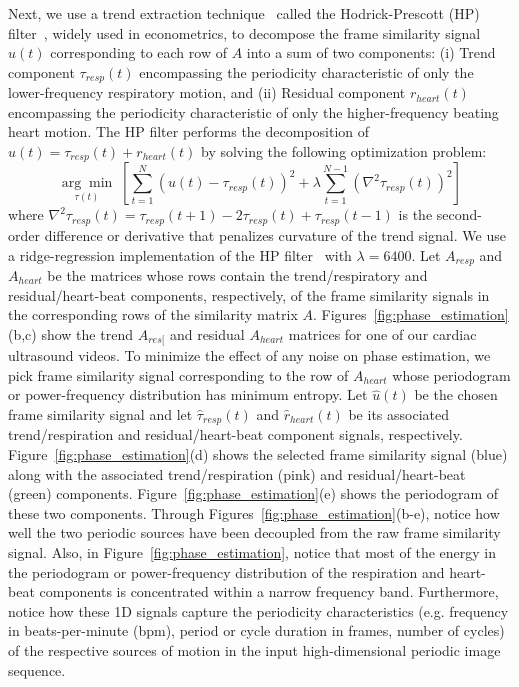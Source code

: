 \documentclass[runningheads,a4paper]{llncs}
\newcommand{\argmin}[1]{\underset{#1}{\operatorname{arg}\operatorname{min}}\;}
\begin{document}
	Next, we use a trend extraction technique~\cite{Alexandrov2012} called the Hodrick-Prescott (HP) filter~\cite{Hodrick1997}, widely used in econometrics, to decompose the frame similarity signal $u(t)$ corresponding to each row of $A$ into a sum of two components: (i) Trend component $\tau_{resp}(t)$ encompassing the periodicity characteristic of only the lower-frequency respiratory motion, and (ii) Residual component $r_{heart}(t)$ encompassing the periodicity characteristic of only the higher-frequency beating heart motion. The HP filter performs the decomposition of $u(t) = \tau_{resp}(t) + r_{heart}(t)$ by solving the following optimization problem:
\begin{equation}	
\argmin{\tau(t)} \left[ \sum_{t=1}^{N}  \left(u(t) - \tau_{resp}(t) \right)^2  + \lambda \sum_{t=1}^{N-1} \left( \nabla^2 \tau_{resp}(t) \right)^2 \right] 
\end{equation}
where $\nabla^2\tau_{resp}(t) = \tau_{resp}(t+1) - 2 \tau_{resp}(t) + \tau_{resp}(t-1)$ is the second-order difference or derivative that penalizes curvature of the trend signal. We use a ridge-regression implementation of the HP filter~\cite{Yamada2015} with $\lambda=6400$. Let $A_{resp}$ and $A_{heart}$ be the matrices whose rows contain the trend/respiratory and residual/heart-beat components, respectively, of the frame similarity signals in the corresponding rows of the similarity matrix $A$. Figures~\ref{fig:phase_estimation}(b,c) show the trend $A_{res[}$ and residual $A_{heart}$ matrices for one of our cardiac ultrasound videos. To minimize the effect of any noise on phase estimation, we pick frame similarity signal corresponding to the row of $A_{heart}$ whose periodogram or power-frequency distribution has minimum entropy. Let $\hat{u}(t)$ be the chosen frame similarity signal and let $\hat{\tau}_{resp}(t)$ and $\hat{r}_{heart}(t)$  be its associated trend/respiration and residual/heart-beat component signals, respectively. Figure~\ref{fig:phase_estimation}(d) shows the selected frame similarity signal (blue) along with the associated trend/respiration (pink) and residual/heart-beat (green) components. Figure~\ref{fig:phase_estimation}(e) shows the periodogram of these two components. Through Figures~\ref{fig:phase_estimation}(b-e), notice how well the two periodic sources have been decoupled from the raw frame similarity signal. Also, in Figure~\ref{fig:phase_estimation}, notice that most of the energy in the periodogram or power-frequency distribution of the respiration and heart-beat components is concentrated within a narrow frequency band. Furthermore, notice how these 1D signals capture the periodicity characteristics (e.g. frequency in beats-per-minute (bpm), period or cycle duration in frames, number of cycles) of the respective sources of motion in the input high-dimensional periodic image sequence.  
		
\end{document}
